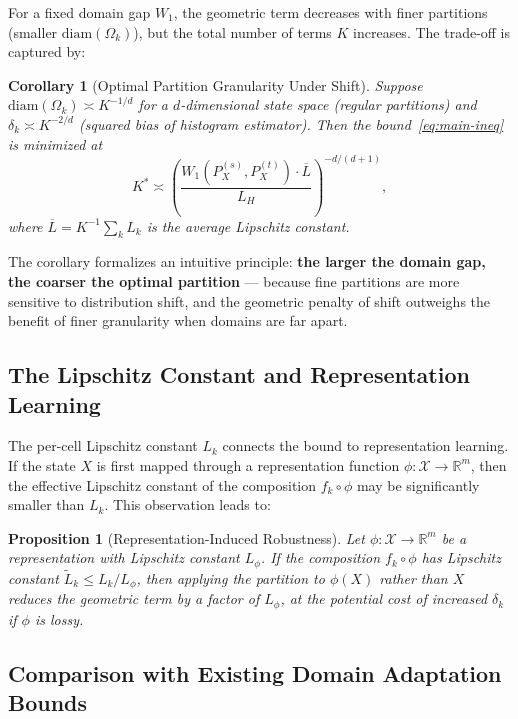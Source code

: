 \documentclass[12pt,a4paper]{article}
\newtheorem{proposition}[theorem]{Proposition}
\newtheorem{corollary}[theorem]{Corollary}
\newcommand{\R}{\mathbb{R}}
\newcommand{\cX}{\mathcal{X}}
\newcommand{\Wass}{W_1}
\newcommand{\diam}{\mathrm{diam}}
\begin{document}
For a fixed domain gap $\Wass$, the geometric term decreases with finer
partitions (smaller $\diam(\Omega_k)$), but the total number of terms $K$
increases.  The trade-off is captured by:

\begin{corollary}[Optimal Partition Granularity Under Shift]
\label{cor:granularity}
Suppose $\diam(\Omega_k)\asymp K^{-1/d}$ for a $d$-dimensional state space
(regular partitions) and $\delta_k\asymp K^{-2/d}$ (squared bias of
histogram estimator).  Then the bound~\eqref{eq:main-ineq} is minimized at
\begin{equation}\label{eq:opt-K}
    K^* \asymp
    \left(\frac{\Wass(P^{(s)}_X,P^{(t)}_X)\cdot\overline{L}}
               {L_H}\right)^{-d/(d+1)},
\end{equation}
where $\overline{L}=K^{-1}\sum_k L_k$ is the average Lipschitz constant.
\end{corollary}

The corollary formalizes an intuitive principle: \textbf{the larger the
domain gap, the coarser the optimal partition} — because fine partitions
are more sensitive to distribution shift, and the geometric penalty of
shift outweighs the benefit of finer granularity when domains are far apart.

\subsection{The Lipschitz Constant and Representation Learning}

The per-cell Lipschitz constant $L_k$ connects the bound to representation
learning.  If the state $X$ is first mapped through a representation
function $\phi:\cX\to\R^m$, then the effective Lipschitz constant of the
composition $f_k\circ\phi$ may be significantly smaller than $L_k$.
This observation leads to:

\begin{proposition}[Representation-Induced Robustness]
\label{prop:rep-robust}
Let $\phi:\cX\to\R^m$ be a representation with Lipschitz constant
$L_\phi$.  If the composition $f_k\circ\phi$ has Lipschitz constant
$\tilde{L}_k \leq L_k/L_\phi$, then applying the partition to
$\phi(X)$ rather than $X$ reduces the geometric term by a factor of
$L_\phi$, at the potential cost of increased $\delta_k$ if $\phi$ is
lossy.
\end{proposition}

\subsection{Comparison with Existing Domain Adaptation Bounds}
\end{document}
